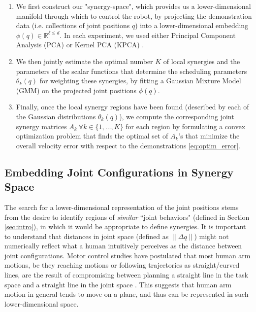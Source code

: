 \documentclass[letterpaper, 10 pt, conference,fleqn]{ieeeconf}
\begin{document}
\begin{enumerate}
\item We first construct our "synergy-space", which provides us a lower-dimensional manifold through which to control the robot, by projecting the demonstration data (i.e. collections of joint positions $q$) into a lower-dimensional embedding $\phi(q)\in \mathbb{R}^{\delta\leq d}$. In each experiment, we used either Principal Component Analysis (PCA) \cite{jolliffe1986pca} or Kernel PCA (KPCA) \cite{scholkopf1997kernel}.

\item We then jointly estimate the optimal number $K$ of local synergies and the parameters of the scalar functions that determine the scheduling parameters $\theta_k(q)$ for weighting these synergies, by fitting a Gaussian Mixture Model (GMM) on the projected joint positions $\phi(q)$.

\item Finally, once the local synergy regions have been found (described by each of the Gaussian distributions $\theta_k(q)$), we compute the corresponding joint synergy matrices $A_k~\forall k\in\{1,\dots,K\}$ for each region by formulating a convex optimization problem that finds the optimal set of $A_k$'s that minimize the overall velocity error with respect to the demonstrations \eqref{eq:optim_error}.
\end{enumerate}

\subsection{Embedding Joint Configurations in Synergy Space}
The search for a lower-dimensional representation of the joint positions stems from the desire to identify regions of \textit{similar} ``joint behaviors" (defined in Section \ref{sec:intro}), in which it would be appropriate to define synergies. It is important to understand that distances in joint space (defined as $\| \Delta q\|$) might not numerically reflect what a human intuitively perceives as the distance between joint configurations. Motor control studies have postulated that most human arm motions, be they reaching motions or following trajectories as straight/curved lines, are the result of compromising between planning a straight line in the task space and a straight line in the joint space \cite{Cruse1987humanarm,Okadome1999arm}. This suggests that human arm motion in general tends to move on a plane, and thus can be represented in such lower-dimensional space. 
\end{document}

